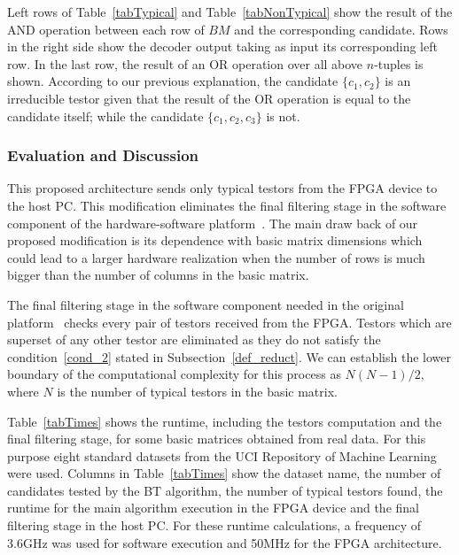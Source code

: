 \documentclass[authoryear,11pt]{elsarticle}
\begin{document}
	Left rows of Table~\ref{tabTypical} and Table~\ref{tabNonTypical} show the result of the AND operation 
	between each row of $BM$ and the corresponding candidate. Rows in the right side show the decoder output 
	taking as input its corresponding left row. In the last row, the result of an OR operation over all 
	above $n$-tuples is shown. According to our previous explanation, the candidate $\{c_1,c_2\}$ is an 
	irreducible testor given that the result of the OR operation is equal to the candidate itself; while the
	candidate $\{c_1,c_2,c_3\}$ is not.
	
\subsubsection{Evaluation and Discussion}
	This proposed architecture sends only typical testors from the FPGA device to the 
	host PC. This modification eliminates the final filtering stage in the software component of the 
	hardware-software platform~\citep{Rojas12}. The main draw back of our proposed modification is its 
	dependence with basic matrix dimensions which could lead to a larger hardware realization when the
	number of rows is much bigger than the number of columns in the basic matrix. 
	
	The final filtering stage in the software component needed in the original platform~\cite{Rojas12} checks 
	every pair of testors received from the FPGA. Testors which are superset of any other testor are 
	eliminated as they do not satisfy the condition~\ref{cond_2} stated in Subsection~\ref{def_reduct}. We 
	can establish the lower boundary of the computational complexity for this process as $N(N-1)/2$, 
	where $N$ is the number of typical testors in the basic matrix. 
	
	Table~\ref{tabTimes} shows the runtime, including the testors computation and the final filtering stage, 
	for some basic matrices obtained from real data. For this purpose eight standard datasets from the UCI
	Repository of Machine Learning \citep{Bache13} were used.
	Columns in Table~\ref{tabTimes} show the dataset name, the number of candidates tested by the BT algorithm,
	the number of typical testors found, the runtime for the main algorithm execution in the 
	FPGA device and the final filtering stage in the host PC. For these runtime calculations, 
	a frequency of 3.6GHz was used for software execution and 50MHz for the FPGA architecture.
	
\end{document}
